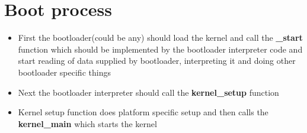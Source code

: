 \documentclass{report}
\begin{document}
\section{Boot process}
\begin{itemize}
	\item First the bootloader(could be any) should load the kernel and call the \textbf{\_start} function which should be implemented by the bootloader interpreter code and start reading of data supplied by bootloader, interpreting it and doing other bootloader specific things
	\item Next the bootloader interpreter should call the \textbf{kernel\_setup} function
	\item Kernel setup function does platform specific setup and then calls the \textbf{kernel\_main} which starts the kernel
\end{itemize}
\end{document}
